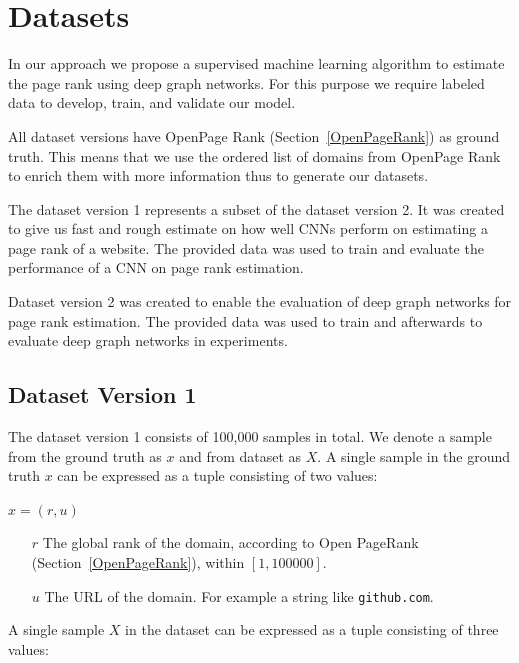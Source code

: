 \section{Datasets}
\label{sec:datasets}

In our approach we propose a supervised machine learning algorithm to estimate the page rank using deep graph networks. For this purpose we require labeled data to develop, train, and validate our model.

All dataset versions have OpenPage Rank (Section~\ref{OpenPageRank}) as ground truth. This means that we use the ordered list of domains from OpenPage Rank to enrich them with more information thus to generate our datasets.

The dataset version 1 represents a subset of the dataset version 2. It was created to give us fast and rough estimate on how well CNNs perform on estimating a page rank of a website. The provided data was used to train and evaluate the performance of a CNN on page rank estimation. 

Dataset version 2 was created to enable the evaluation of deep graph networks for page rank estimation. The provided data was used to train and afterwards to evaluate deep graph networks in experiments. 

\subsection{Dataset Version 1}
\label{DatasetVersion1}
The dataset version 1 consists of 100,000 samples in total. We denote a sample from the ground truth as $x$ and from dataset as $X$. A single sample in the ground truth $x$ can be expressed as a tuple consisting of two values:

\begin{center}
	$x  = (r, u)$
	\begin{itemize}
		\item[$r$] The global rank of the domain, according to Open PageRank (Section~\ref{OpenPageRank}), within $[1, 100000]$. 
		\item[$u$] The URL of the domain. For example a string like \texttt{github.com}.
	\end{itemize}
\end{center}

A single sample $X$ in the dataset can be expressed as a tuple consisting of three values:

